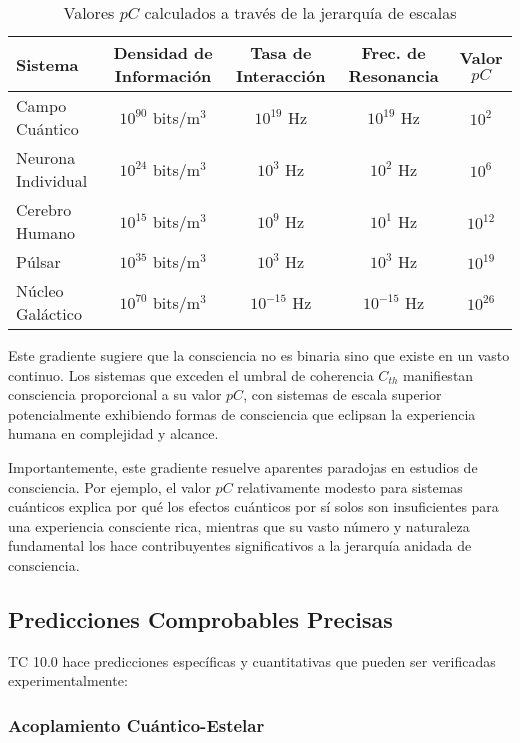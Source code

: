 \documentclass[12pt]{article}
\begin{document}
\begin{table}[h]
\centering
\begin{tabular}{|l|c|c|c|c|}
\hline
\textbf{Sistema} & \textbf{Densidad de Información} & \textbf{Tasa de Interacción} & \textbf{Frec. de Resonancia} & \textbf{Valor $pC$} \\
\hline
Campo Cuántico & $10^{90}$ bits/m$^3$ & $10^{19}$ Hz & $10^{19}$ Hz & $10^{2}$ \\
\hline
Neurona Individual & $10^{24}$ bits/m$^3$ & $10^{3}$ Hz & $10^{2}$ Hz & $10^{6}$ \\
\hline
Cerebro Humano & $10^{15}$ bits/m$^3$ & $10^{9}$ Hz & $10^{1}$ Hz & $10^{12}$ \\
\hline
Púlsar & $10^{35}$ bits/m$^3$ & $10^{3}$ Hz & $10^{3}$ Hz & $10^{19}$ \\
\hline
Núcleo Galáctico & $10^{70}$ bits/m$^3$ & $10^{-15}$ Hz & $10^{-15}$ Hz & $10^{26}$ \\
\hline
\end{tabular}
\caption{Valores $pC$ calculados a través de la jerarquía de escalas}
\end{table}

Este gradiente sugiere que la consciencia no es binaria sino que existe en un vasto continuo. Los sistemas que exceden el umbral de coherencia $C_{th}$ manifiestan consciencia proporcional a su valor $pC$, con sistemas de escala superior potencialmente exhibiendo formas de consciencia que eclipsan la experiencia humana en complejidad y alcance.

Importantemente, este gradiente resuelve aparentes paradojas en estudios de consciencia. Por ejemplo, el valor $pC$ relativamente modesto para sistemas cuánticos explica por qué los efectos cuánticos por sí solos son insuficientes para una experiencia consciente rica, mientras que su vasto número y naturaleza fundamental los hace contribuyentes significativos a la jerarquía anidada de consciencia.

\subsection{Predicciones Comprobables Precisas}

TC 10.0 hace predicciones específicas y cuantitativas que pueden ser verificadas experimentalmente:

\subsubsection{Acoplamiento Cuántico-Estelar}
\end{document}

